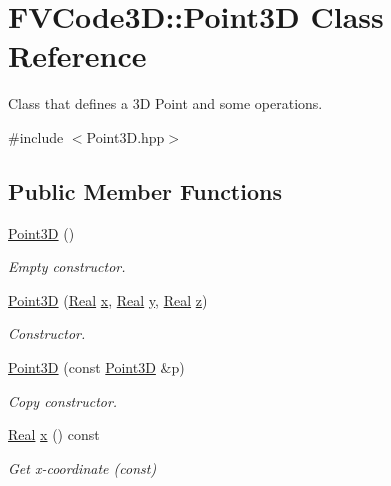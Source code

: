 \hypertarget{classFVCode3D_1_1Point3D}{}\section{F\+V\+Code3D\+:\+:Point3D Class Reference}
\label{classFVCode3D_1_1Point3D}


Class that defines a 3D Point and some operations.  




{\ttfamily \#include $<$Point3\+D.\+hpp$>$}

\subsection*{Public Member Functions}
\begin{DoxyCompactItemize}
\item 
\hyperlink{classFVCode3D_1_1Point3D_a56a8ed59079e64f6463c83acfd8f14ae}{Point3D} ()
\begin{DoxyCompactList}\small\item\em Empty constructor. \end{DoxyCompactList}\item 
\hyperlink{classFVCode3D_1_1Point3D_a3d130ba4098b4bf0892091e121af6c52}{Point3D} (\hyperlink{namespaceFVCode3D_a40c1f5588a248569d80aa5f867080e83}{Real} \hyperlink{classFVCode3D_1_1Point3D_ae015d6aa31f8b304f69696bdcbd4da19}{x}, \hyperlink{namespaceFVCode3D_a40c1f5588a248569d80aa5f867080e83}{Real} \hyperlink{classFVCode3D_1_1Point3D_a950abcabbf3bb32fc2daf64c28d77416}{y}, \hyperlink{namespaceFVCode3D_a40c1f5588a248569d80aa5f867080e83}{Real} \hyperlink{classFVCode3D_1_1Point3D_a865109e2006cc1de3681ab601081f5aa}{z})
\begin{DoxyCompactList}\small\item\em Constructor. \end{DoxyCompactList}\item 
\hyperlink{classFVCode3D_1_1Point3D_a166b3b826c327fb8033a38e78a382b92}{Point3D} (const \hyperlink{classFVCode3D_1_1Point3D}{Point3D} \&p)
\begin{DoxyCompactList}\small\item\em Copy constructor. \end{DoxyCompactList}\item 
\hyperlink{namespaceFVCode3D_a40c1f5588a248569d80aa5f867080e83}{Real} \hyperlink{classFVCode3D_1_1Point3D_ae015d6aa31f8b304f69696bdcbd4da19}{x} () const 
\begin{DoxyCompactList}\small\item\em Get x-\/coordinate (const) \end{DoxyCompactList}\item 

\end{DoxyCompactItemize}
